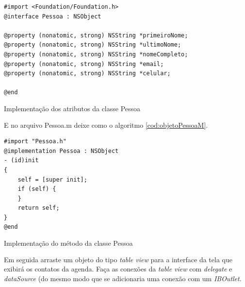 \documentclass[a4paper,12pt,brazil,doubleside]{book}
\begin{document}
\begin{singlespace}
\begin{listing}[H]
\begin{verbatim}
#import <Foundation/Foundation.h>
@interface Pessoa : NSObject

@property (nonatomic, strong) NSString *primeiroNome;
@property (nonatomic, strong) NSString *ultimoNome;
@property (nonatomic, strong) NSString *nomeCompleto;
@property (nonatomic, strong) NSString *email;
@property (nonatomic, strong) NSString *celular;

@end
\end{verbatim}
\caption{Implementação dos atributos da classe Pessoa}
\label{cod:objetoPessoaH}
\end{listing}

E no arquivo Pessoa.m deixe como o algoritmo \ref{cod:objetoPessoaM}.

\begin{listing}[H]
\begin{verbatim}
#import "Pessoa.h"
@implementation Pessoa : NSObject
- (id)init
{
    self = [super init];
    if (self) {        
    }
    return self;
}
@end
\end{verbatim}
\caption{Implementação do método da classe Pessoa}
\label{cod:objetoPessoaM}
\end{listing}

Em seguida arraste um objeto do tipo \emph{table view} para a interface da tela que exibirá os contatos da agenda. Faça as conexões da \emph{table view} com \emph{delegate} e \emph{dataSource} (do mesmo modo que se adicionaria uma conexão com um \emph{IBOutlet}.


\end{singlespace}
\end{document}
